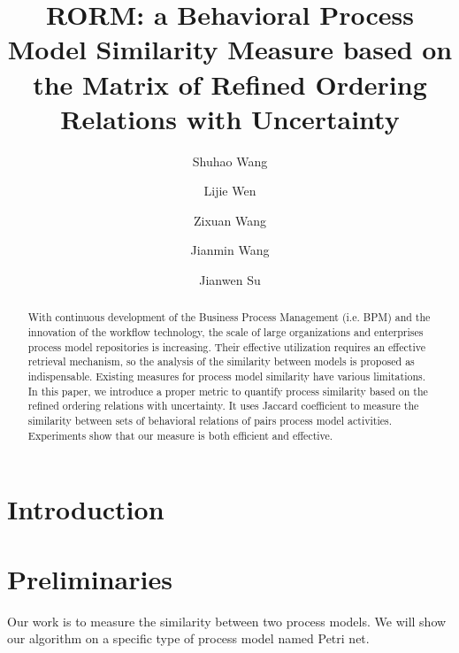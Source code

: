 \documentclass{llncs}
\begin{document}
\frontmatter 
{}

\mainmatter
\title{RORM: a Behavioral Process Model Similarity Measure based on the Matrix of Refined Ordering Relations with Uncertainty}

\author[$\$$]{Shuhao Wang}
\author[$\$$]{Lijie Wen}
\author[$\$$]{Zixuan Wang}
\author[$\$$]{Jianmin Wang}
\author[$\#$]{Jianwen Su}
\institute{}

\maketitle

\begin{abstract}
With continuous development of the Business Process Management (i.e. BPM) and the innovation of the workflow technology, the scale of large organizations and enterprises process model repositories is increasing. Their effective utilization requires an effective retrieval mechanism, so the analysis of the similarity between models is proposed as indispensable. Existing measures for process model similarity have various limitations. In this paper, we introduce a proper metric to quantify process similarity based on the refined ordering relations with uncertainty. It uses Jaccard coefficient to measure the similarity between sets of behavioral relations of pairs process model activities. Experiments show that our measure is both efficient and effective.
\end{abstract}

\section{Introduction}\label{sec:introduction}

\section{Preliminaries}\label{sec:preliminaries}
Our work is to measure the similarity between two process models. We will show our algorithm on a specific type of process model named Petri net.
\end{document}
